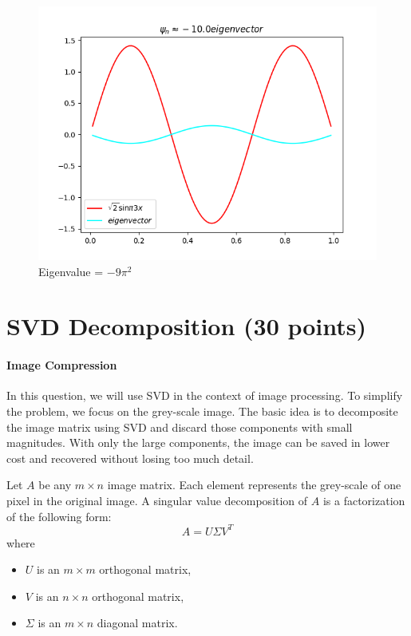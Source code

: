 \documentclass[10pt]{article}
\begin{document}
\begin{enumerate}[label=2.\arabic*]
\begin{figure}[H]
		\includegraphics[scale=0.7]{Eigenvectors/eigen_vector3.png}
		\caption{Eigenvalue = $-9\pi^{2}$}
	\end{figure}
\end{enumerate}

\section{SVD Decomposition (30 points)}

\paragraph{Image Compression} In this question, we will use SVD in the context of image processing. 
To simplify the problem, we focus on the grey-scale image. 
The basic idea is to decomposite the image matrix using SVD and discard those components with small magnitudes.
With only the large components, the image can be saved in lower cost and recovered without losing too much detail.

Let $A$ be any $m \times n$ image matrix. 
Each element represents the grey-scale of one pixel in the original image.
A singular value decomposition of $A$ is a factorization of the following form:
$$
A=U \Sigma V^{T}
$$
where

\begin{itemize}
    \item $U$ is an $m \times m$ orthogonal matrix,
    \item $V$ is an $n \times n$ orthogonal matrix,
    \item $\Sigma$ is an $m \times n$ diagonal matrix.
\end{itemize}
\end{document}
